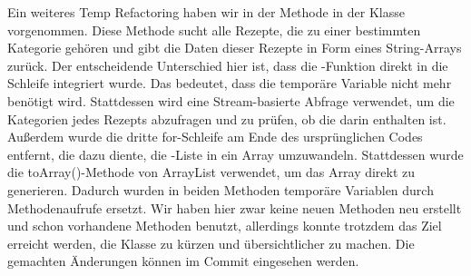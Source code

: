 Ein weiteres Temp Refactoring haben wir in der Methode  in der Klasse  vorgenommen. Diese Methode sucht alle Rezepte, die zu einer bestimmten Kategorie gehören und gibt die Daten dieser Rezepte in Form eines String-Arrays zurück. Der entscheidende Unterschied hier ist, dass die -Funktion direkt in die Schleife integriert wurde. Das bedeutet, dass die temporäre Variable  nicht mehr benötigt wird. Stattdessen wird eine Stream-basierte Abfrage verwendet, um die Kategorien jedes Rezepts abzufragen und zu prüfen, ob die  darin enthalten ist.
Außerdem wurde die dritte for-Schleife am Ende des ursprünglichen Codes entfernt, die dazu diente, die -Liste in ein Array umzuwandeln. Stattdessen wurde die toArray()-Methode von ArrayList verwendet, um das Array direkt zu generieren. 
Dadurch wurden in beiden Methoden temporäre Variablen durch Methodenaufrufe ersetzt. Wir haben hier zwar keine neuen Methoden neu erstellt und schon vorhandene Methoden benutzt, allerdings konnte trotzdem das Ziel erreicht werden, die Klasse zu kürzen und übersichtlicher zu machen. Die gemachten Änderungen können im Commit \href{https://github.com/MichaelaHaag/RezeptApp/commit/4e0bedc859ba644d448fe4c89a3a6e1320519593}{} eingesehen werden. 

